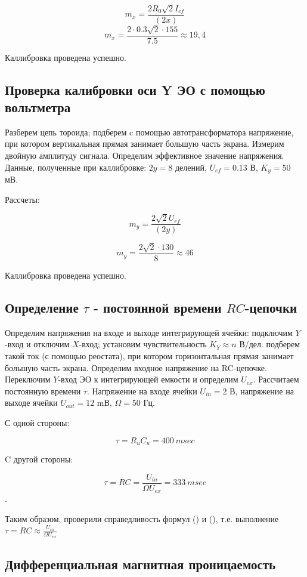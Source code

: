 $$m_x=\frac{2R_0\sqrt{2}I_{ef}}{(2x)}$$
$$m_x=\frac{2\cdot 0.3 \sqrt{2}\cdot 155}{7.5} \approx 19,4$$ 


Каллибровка проведена успешно.


\subsection {Проверка калибровки оси Y ЭО с помощью вольтметра}

Разберем цепь тороида; подберем c помощью автотрансформатора напряжение, при котором вертикальная прямая занимает большую часть экрана. Измерим двойную амплитуду сигнала. Определим эффективное значение напряжения. 
\newline
Данные, полученные при каллибровке:
$2y = 8$ делений, $U_{ef} = 0.13$ В, $K_y = 50$ мВ.
\newline

Рассчеты:

$$m_y=\frac{2\sqrt{2}U_{ef}}{(2y)}$$

$$m_y=\frac{2\sqrt{2} \cdot 130}{8} \approx 46$$

Каллибровка проведена успешно.

\subsection {Определение $\tau$ - постоянной времени $RC$-цепочки}


Определим напряжения на входе и выходе интегрирующей ячейки: подключим $Y$-вход и отключим $X$-вход; установим чувствительность $K_Y \approx n$ В/дел. подберем такой ток (с помощью реостата), при котором горизонтальная прямая занимает большую часть экрана. Определим входное напряжение на RC-цепочке. Переключим $Y$-вход ЭО к интегрирующей емкости и определим $U_{ex}$. Рассчитаем постоянную времени $\tau$.
\newline
Напряжение на входе ячейки $U_{in} = 2$ В, напряжение на выходе ячейки $U_{out} = 12$ mВ, $\Omega=50$ Гц.

С одной стороны:

$$\tau=R_uC_u=400 \: msec
$$


C другой стороны:


$$\tau=RC=\frac{U_{in}}{\Omega U_{ex}}=333 \: msec $$ .

Таким образом, проверили справедливость формул () и (), т.е. выполнение $\tau=RC \approx \frac{U_{in}}{\Omega U_{ex}}$




\subsection{Дифференциальная магнитная проницаемость}




